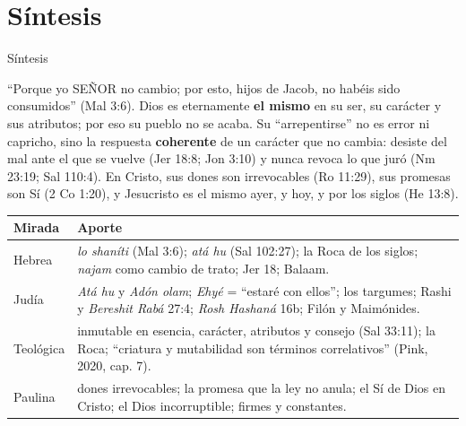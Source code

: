 \documentclass[hyperref={bookmarks=false},aspectratio=169]{beamer}
\newcommand{\SENOR}{S{\fontsize{0.78em}{1em}\selectfont EÑOR}}
\newcommand{\destacar}[1]{\textbf{\textcolor{azul}{#1}}}
\begin{document}
\section{Síntesis}

\begin{frame}{Síntesis}
\begin{tcolorbox}[colback=papiro,colframe=azul,boxrule=1pt,arc=3pt]
\small ``Porque yo \SENOR{} no cambio; por esto, hijos de Jacob, no habéis sido consumidos'' (Mal 3:6). Dios es eternamente \destacar{el mismo} en su ser, su carácter y sus atributos; por eso su pueblo no se acaba. Su ``arrepentirse'' no es error ni capricho, sino la respuesta \destacar{coherente} de un carácter que no cambia: desiste del mal ante el que se vuelve (Jer 18:8; Jon 3:10) y nunca revoca lo que juró (Nm 23:19; Sal 110:4). En Cristo, sus dones son irrevocables (Ro 11:29), sus promesas son Sí (2 Co 1:20), y Jesucristo es el mismo ayer, y hoy, y por los siglos (He 13:8).
\end{tcolorbox}
\scriptsize\renewcommand{\arraystretch}{1.13}
\begin{tabular}{@{}>{\RaggedRight\arraybackslash}p{2.0cm}>{\RaggedRight\arraybackslash}p{9.8cm}@{}}
\toprule
\textbf{Mirada} & \textbf{Aporte} \\ \midrule
Hebrea & \emph{lo shaníti} (Mal 3:6); \emph{atá hu} (Sal 102:27); la Roca de los siglos; \emph{najam} como cambio de trato; Jer 18; Balaam. \\
Judía & \emph{Atá hu} y \emph{Adón olam}; \emph{Ehyé} = ``estaré con ellos''; los targumes; Rashi y \emph{Bereshit Rabá} 27:4; \emph{Rosh Hashaná} 16b; Filón y Maimónides. \\
Teológica & inmutable en esencia, carácter, atributos y consejo (Sal 33:11); la Roca; ``criatura y mutabilidad son términos correlativos'' (Pink, 2020, cap. 7). \\
Paulina & dones irrevocables; la promesa que la ley no anula; el Sí de Dios en Cristo; el Dios incorruptible; firmes y constantes. \\
\bottomrule
\end{tabular}
\end{frame}
\end{document}
